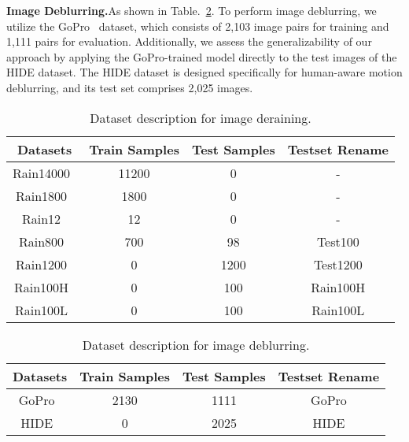 \documentclass[sn-mathphys,Numbered]{sn-jnl}
\theoremstyle{thmstyleone}\newtheorem{theorem}{Theorem}\newtheorem{proposition}[theorem]{Proposition}
\theoremstyle{thmstyletwo}\newtheorem{example}{Example}\newtheorem{remark}{Remark}
\theoremstyle{thmstylethree}\newtheorem{definition}{Definition}
\begin{document}
\noindent\textbf{Image Deblurring.}As shown in Table.~\ref{tb:001}. To perform image deblurring, we utilize the GoPro~\cite{Gopro} dataset, which consists of 2,103 image pairs for training and 1,111 pairs for evaluation. Additionally, we assess the generalizability of our approach by applying the GoPro-trained model directly to the test images of the HIDE dataset. The HIDE dataset is designed specifically for human-aware motion deblurring, and its test set comprises 2,025 images.

\begin{table}
\caption{ Dataset description for image deraining.
}
\label{tb:000}
\begin{tabular}{cccc}
    \hline
     Datasets &Train Samples &Test Samples &Testset Rename
    \\
    \hline\hline
     Rain14000~\cite{238099669} &11200 &0 & -
     \\
    Rain1800~\cite{81Yang2016DeepJR} &1800 &0 & -
        \\
    Rain12~\cite{487780668} &12 &0 &- 
    \\
    Rain800~\cite{90Zhang2017ImageDU} &700 & 98 &Test100
    \\
    Rain1200~\cite{DIDMDN} &0 &1200 &Test1200
    \\
    Rain100H~\cite{81Yang2016DeepJR} &0 &100 & Rain100H
    \\
    Rain100L~\cite{81Yang2016DeepJR} &0 &100 &Rain100L
    \\
    \hline
\end{tabular}
\end{table}

\begin{table}
\caption{ Dataset description for image deblurring.
}
\label{tb:001}
\begin{tabular}{cccc}
    \hline
     Datasets &Train Samples &Test Samples &Testset Rename
    \\
    \hline\hline
    GoPro~\cite{Gopro} &2130 &1111 & GoPro
    \\
    HIDE~\cite{HIDE} &0 &2025 &HIDE
    \\
    \hline
\end{tabular}
\end{table}
\end{document}
